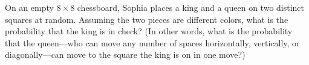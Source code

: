 On an empty $8\times 8$ chessboard, Sophia places a king and a queen on two distinct squares at random. Assuming the two pieces are different colors, what is the probability that the king is in check? (In other words, what is the probability that the queen---who can move any number of spaces horizontally, vertically, or diagonally---can move to the square the king is on in one move?)
